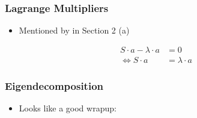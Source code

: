 
\subsubsection{Lagrange Multipliers}

\begin{itemize}
	\item Mentioned by \cite{jolliffe2016principal} in Section 2 (a)
\end{itemize}

\begin{align}
	S \cdot a - \lambda \cdot a &= 0 \\
	\Leftrightarrow S \cdot a &= \lambda \cdot a
\end{align}

\clearpage


\subsubsection{Eigendecomposition}

\begin{itemize}
	\item Looks like a good wrapup: \cite{abdi2007eigen}
\end{itemize}

\clearpage

